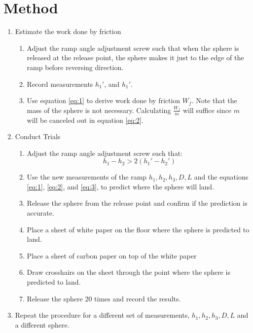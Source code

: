 \documentclass{article}
\begin{document}
\clearpage
\section{Method}
\begin{enumerate}

    \item Estimate the work done by friction 
        \begin{enumerate}
            \item Adjust the ramp angle adjustment screw such that when the sphere is released at the release point, the sphere makes it just to the edge of the ramp before reversing direction.
            \item Record measurements $h_{1}\ensuremath{'}$, and $h_{1}\ensuremath{'}$.
            \item Use equation \eqref{eq:1} to derive work done by friction $W_{f}$. Note that the mass of the sphere is not necessary. Calculating $\frac{W_{f}}{m}$ will suffice since $m$ will be canceled out in equation \eqref{eq:2}.
        \end{enumerate}

    \item Conduct Trials
        \begin{enumerate}
            \item Adjust the ramp angle adjustment screw such that: \\
                \begin{equation} h_{1} - h_{2} > 2(h_{1}\ensuremath{'} - h_{2}\ensuremath{'}) \end{equation}
            \item Use the new measurements of the ramp $h_{1}, h_{2}, h_{3}, D, L$ and the equations \eqref{eq:1}, \eqref{eq:2}, and \eqref{eq:3}, to predict where the sphere will land. 
            \item Release the sphere from the release point and confirm if the prediction is accurate.
            \item Place a sheet of white paper on the floor where the sphere is predicted to land.
            \item Place a sheet of carbon paper on top of the white paper
            \item Draw crosshairs on the sheet through the point where the sphere is predicted to land.
            \item Release the sphere 20 times and record the results.

        \end{enumerate}

    \item Repeat the procedure for a different set of measurements, $h_{1}, h_{2}, h_{3}, D, L$ and a different sphere.
\end{enumerate}
 
\end{document}
